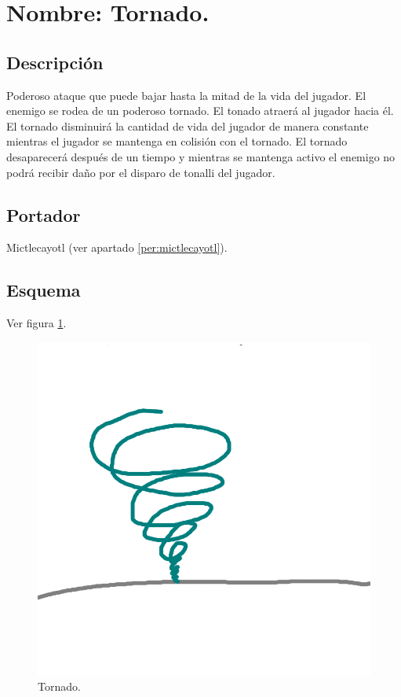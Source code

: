 \section{Nombre: Tornado.} \label{hab.tornado}
\subsection{Descripción}
Poderoso ataque que puede bajar hasta la mitad de la vida del jugador. El enemigo se rodea de un poderoso tornado. El tonado atraerá al jugador hacia él. El tornado disminuirá la cantidad de vida del jugador de manera constante mientras el jugador se mantenga en colisión con el tornado. El tornado desaparecerá después de un tiempo y mientras se mantenga activo el enemigo no podrá recibir daño por el disparo de tonalli del jugador.
\subsection{Portador}
Mictlecayotl (ver apartado \ref{per:mictlecayotl}).
\subsection{Esquema}
			Ver figura \ref{fig:tornado}.
			\begin{figure}
				\centering
				\includegraphics[height=0.2 \textheight]{Imagenes/tornado}
				\caption{Tornado.}
				\label{fig:tornado}
			\end{figure}
